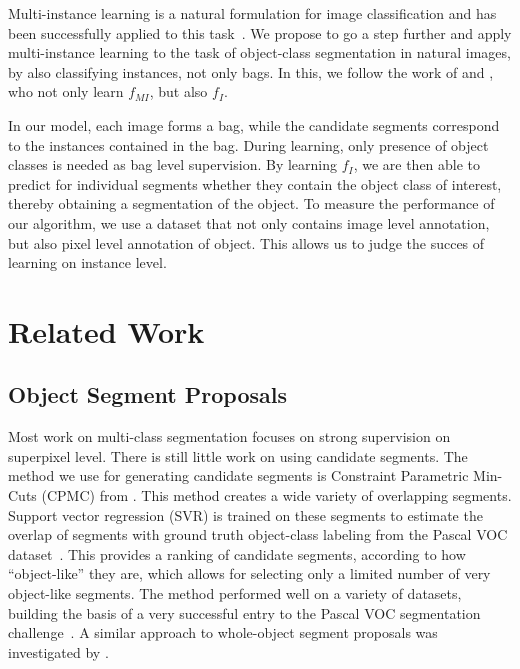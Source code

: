 Multi-instance learning is a natural formulation for image classification and
has been successfully applied to this task~\citep{zhou2007multi}. We propose to
go a step further and apply multi-instance learning to the task of object-class
segmentation in natural images, by also classifying instances, not only bags.
In this, we follow the work of \citet{liconvex2010} and \citet{zha2008joint}, who not
only learn $f_{MI}$, but also $f_{I}$.

In our model, each image forms a bag, while the candidate segments correspond
to the instances contained in the bag. During learning, only presence of object
classes is needed as bag level supervision. By learning $f_{I}$, we are then
able to predict for individual segments whether they contain the object class
of interest, thereby obtaining a segmentation of the object.
To measure the performance of our algorithm, we use a dataset that not only contains
image level annotation, but also pixel level annotation of object. This allows
us to judge the succes of learning on instance level.

\section{Related Work}
\subsection{Object Segment Proposals}\label{related_segments}
Most work on multi-class segmentation focuses on strong supervision on
superpixel level. There is still little work on using candidate segments.  The
method we use for generating candidate segments is Constraint Parametric
Min-Cuts (CPMC) from \citet{carreira2010constrained}.  This method creates a
wide variety of overlapping segments. Support vector regression (SVR) is
trained on these segments to estimate the overlap of segments with ground truth
object-class labeling from the Pascal VOC dataset~\citep{pascal}. This provides
a ranking of candidate segments, according to how ``object-like'' they are,
which allows for selecting only a limited number of very object-like segments.
The method performed well on a variety of datasets, building the basis of
a very successful entry to the Pascal VOC segmentation
challenge~\citep{li2010object}. A similar approach to whole-object segment
proposals was investigated by \citet{endres2010category}.

